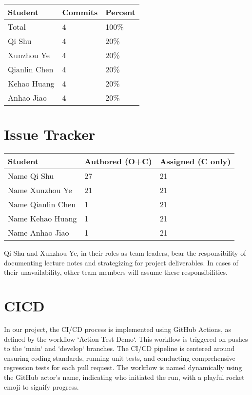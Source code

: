 \documentclass{article}
\begin{document}
\begin{table}[H]
\centering
\begin{tabular}{lll}
\toprule
\textbf{Student} & \textbf{Commits} & \textbf{Percent}\\
\midrule
Total & 4 & 100\% \\
Qi Shu & 4 & 20\% \\
Xunzhou Ye & 4 & 20\% \\
Qianlin Chen & 4 & 20\% \\
Kehao Huang & 4 & 20\% \\
Anhao Jiao & 4 & 20\% \\
\bottomrule
\end{tabular}
\end{table}



\section{Issue Tracker}


\begin{table}[H]
\centering
\begin{tabular}{lll}
\toprule
\textbf{Student} & \textbf{Authored (O+C)} & \textbf{Assigned (C only)}\\
\midrule
Name Qi Shu & 27 & 21 \\
Name Xunzhou Ye & 21 & 21 \\
Name Qianlin Chen & 1 & 21 \\
Name Kehao Huang & 1 & 21 \\
Name Anhao Jiao & 1 & 21 \\
\bottomrule
\end{tabular}
\end{table}


Qi Shu and Xunzhou Ye, in their roles as team leaders, bear the responsibility of 
documenting lecture notes and strategizing for project deliverables. In cases 
of their unavailability, other team members will assume these responsibilities.

\section{CICD}
In our project, the CI/CD process is implemented using GitHub Actions, as defined by the workflow `Action-Test-Demo`. 
This workflow is triggered on pushes to the `main` and `develop` branches. 
The CI/CD pipeline is centered around ensuring coding standards, running unit tests, and conducting comprehensive regression tests for each pull request. 
The workflow is named dynamically using the GitHub actor's name, indicating who initiated the run, with a playful rocket emoji to signify progress.
\end{document}
